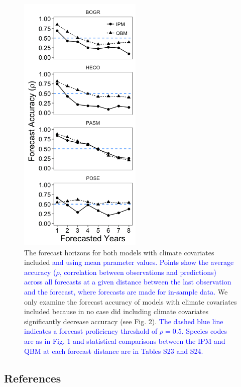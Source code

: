 \documentclass[12pt,]{article}
\begin{document}
\newpage{}

\begin{figure}[!ht]
  \centering
      \includegraphics[height=5in]{./components/forecast_horizon.png}
  \caption{The forecast horizons for both models with climate covariates included \textcolor{blue}{and using mean parameter values. Points show the average accuracy ($\rho$, \textcolor{blue}{correlation between observations and predictions}) across all forecasts at a given distance between the last observation and the forecast, where forecasts are made for in-sample data.} We only examine the forecast accuracy of models with climate covariates included because in no case did including climate covariates significantly decrease accuracy (see Fig. 2). \textcolor{blue}{The dashed blue line indicates a forecast proficiency threshold of $\rho = 0.5$. Species codes are as in Fig. 1 and statistical comparisons between the IPM and QBM at each forecast distance are in Tables S23 and S24.}}
\end{figure}

\newpage{}

\singlespace{}

\subsection*{References}\label{references}
\end{document}
